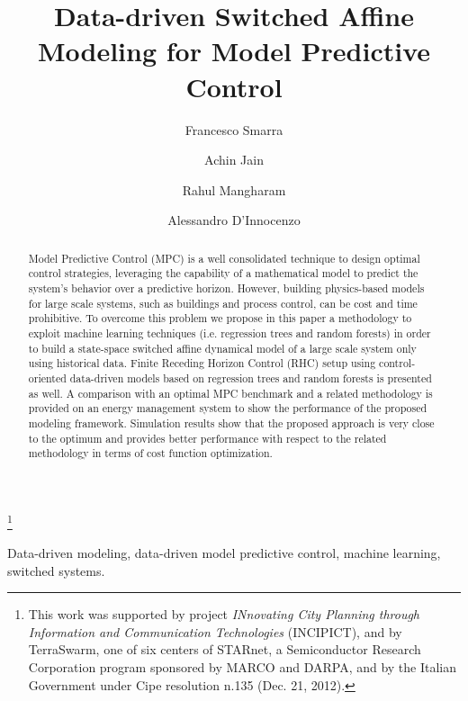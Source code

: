 \documentclass[]{ifacconf}  %
\begin{document}
\begin{frontmatter}
	
	\title{Data-driven Switched Affine Modeling for Model Predictive Control} 
	
	\thanks[footnoteinfo]{This work was supported by project \emph{INnovating City Planning through Information and Communication Technologies} (INCIPICT), and by TerraSwarm, one of six centers of STARnet, a Semiconductor Research Corporation program sponsored by MARCO and DARPA, and by the Italian Government under Cipe resolution n.135 (Dec. 21, 2012).}
	
	\author[First,Second]{Francesco Smarra} 
	\author[Second]{Achin Jain} 
	\author[Second]{Rahul Mangharam}
	\author[First]{Alessandro D'Innocenzo}
	
	\address[First]{Department of Information Engineering, Computer Science and Mathematics, University of L'Aquila, Via Vetoio, 67100 L'Aquila, Italy \\(e-mail: [francesco.smarra,alessandro.dinnocenzo]@univaq.it).}
	\address[Second]{Department of Electrical and Systems Engineering, University of Pennsylvania, 200 South 33rd Street, 19104 Philadelphia, PA, USA (e-mail: [fsmarra,achinj,rahulm]@seas.upenn.edu)}

\begin{abstract}
Model Predictive Control (MPC) is a well consolidated technique to design optimal control strategies, leveraging the capability of a mathematical model to predict the system's behavior over a predictive horizon. 
However, building physics-based models for large scale systems, such as buildings and process control, can be cost and time prohibitive.
To overcome this problem we propose in this paper a methodology to exploit machine learning techniques (i.e. regression trees and random forests) in order to build a state-space switched affine dynamical model of a large scale system only using historical data.
Finite Receding Horizon Control (RHC) setup using control-oriented data-driven models based on regression trees and random forests is presented as well.
A comparison with an optimal MPC benchmark and a related methodology is provided on an energy management system to show the performance of the proposed modeling framework.
Simulation results show that the proposed approach is very close to the optimum and provides better performance with respect to the related methodology in terms of cost function optimization.
\end{abstract}

\begin{keyword}
	Data-driven modeling, data-driven model predictive control, machine learning, switched systems.
\end{keyword}

\end{frontmatter}
\end{document}
